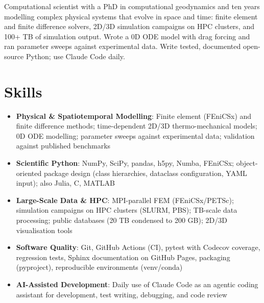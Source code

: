 \documentclass[11pt,a4paper,sans]{moderncv}
\begin{document}
\makecvtitle


\vspace{6pt}
\small{Computational scientist with a PhD in computational geodynamics and ten years modelling complex physical systems that evolve in space and time: finite element and finite difference solvers, 2D/3D simulation campaigns on HPC clusters, and 100+ TB of simulation output. Wrote a 0D ODE model with drag forcing and ran parameter sweeps against experimental data. Write tested, documented open-source Python; use Claude Code daily.}


\section{Skills}
\vspace{1pt}
\begin{itemize}

\item \textbf{Physical \& Spatiotemporal Modelling}: Finite element (FEniCSx) and finite difference methods; time-dependent 2D/3D thermo-mechanical models; 0D ODE modelling; parameter sweeps against experimental data; validation against published benchmarks

\item \textbf{Scientific Python}: NumPy, SciPy, pandas, h5py, Numba, FEniCSx; object-oriented package design (class hierarchies, dataclass configuration, YAML input); also Julia, C, MATLAB

\item \textbf{Large-Scale Data \& HPC}: MPI-parallel FEM (FEniCSx/PETSc); simulation campaigns on HPC clusters (SLURM, PBS); TB-scale data processing; public databases (20 TB condensed to 200 GB); 2D/3D visualisation tools

\item \textbf{Software Quality}: Git, GitHub Actions (CI), pytest with Codecov coverage, regression tests, Sphinx documentation on GitHub Pages, packaging (pyproject), reproducible environments (venv/conda)

\item \textbf{AI-Assisted Development}: Daily use of Claude Code as an agentic coding assistant for development, test writing, debugging, and code review

\end{itemize}
\end{document}
